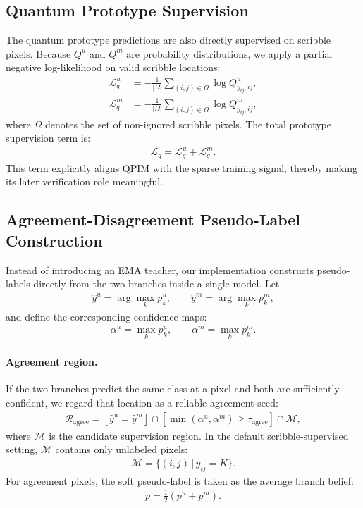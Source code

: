 \subsection{Quantum Prototype Supervision}
\label{subsec:quantum_prototype_supervision}
The quantum prototype predictions are also directly supervised on scribble pixels. Because $Q^u$ and $Q^m$ are probability distributions, we apply a partial negative log-likelihood on valid scribble locations:
\begin{align}
    \mathcal{L}_{q}^u &= - \frac{1}{|\Omega|}
    \sum_{(i,j)\in\Omega}
    \log Q^u_{y_{ij},ij}, \\
    \mathcal{L}_{q}^m &= - \frac{1}{|\Omega|}
    \sum_{(i,j)\in\Omega}
    \log Q^m_{y_{ij},ij},
\end{align}
where $\Omega$ denotes the set of non-ignored scribble pixels. The total prototype supervision term is:
\begin{align}
    \mathcal{L}_{q} = \mathcal{L}_{q}^u + \mathcal{L}_{q}^m.
\end{align}
This term explicitly aligns QPIM with the sparse training signal, thereby making its later verification role meaningful.

\subsection{Agreement-Disagreement Pseudo-Label Construction}
\label{subsec:agreement_disagreement}
Instead of introducing an EMA teacher, our implementation constructs pseudo-labels directly from the two branches inside a single model. Let
\begin{align}
    \hat{y}^u = \arg\max_k p_k^u, \qquad
    \hat{y}^m = \arg\max_k p_k^m,
\end{align}
and define the corresponding confidence maps:
\begin{align}
    \alpha^u = \max_k p_k^u, \qquad
    \alpha^m = \max_k p_k^m.
\end{align}

\paragraph{Agreement region.}
If the two branches predict the same class at a pixel and both are sufficiently confident, we regard that location as a reliable agreement seed:
\begin{align}
    \mathcal{R}_{\mathrm{agree}}
    =
    \left[
    \hat{y}^u = \hat{y}^m
    \right]
    \cap
    \left[
    \min(\alpha^u,\alpha^m) \ge \tau_{\mathrm{agree}}
    \right]
    \cap
    \mathcal{M},
\end{align}
where $\mathcal{M}$ is the candidate supervision region. In the default scribble-supervised setting, $\mathcal{M}$ contains only unlabeled pixels:
\begin{align}
    \mathcal{M} = \{(i,j)\,|\, y_{ij}=K\}.
\end{align}
For agreement pixels, the soft pseudo-label is taken as the average branch belief:
\begin{align}
    \tilde{p} = \frac{1}{2}(p^u + p^m).
\end{align}

